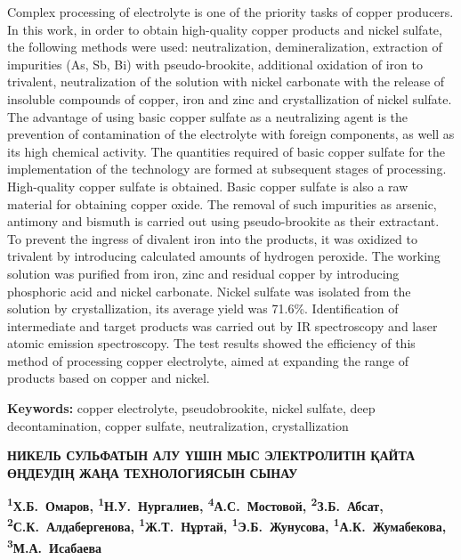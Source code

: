 Complex processing of electrolyte is one of the priority tasks of copper
producers. In this work, in order to obtain high-quality copper products
and nickel sulfate, the following methods were used: neutralization,
demineralization, extraction of impurities (As, Sb, Bi) with
pseudo-brookite, additional oxidation of iron to trivalent,
neutralization of the solution with nickel carbonate with the release of
insoluble compounds of copper, iron and zinc and crystallization of
nickel sulfate. The advantage of using basic copper sulfate as a
neutralizing agent is the prevention of contamination of the electrolyte
with foreign components, as well as its high chemical activity. The
quantities required of basic copper sulfate for the implementation of
the technology are formed at subsequent stages of processing.
High-quality copper sulfate is obtained. Basic copper sulfate is also a
raw material for obtaining copper oxide. The removal of such impurities
as arsenic, antimony and bismuth is carried out using pseudo-brookite as
their extractant. To prevent the ingress of divalent iron into the
products, it was oxidized to trivalent by introducing calculated amounts
of hydrogen peroxide. The working solution was purified from iron, zinc
and residual copper by introducing phosphoric acid and nickel carbonate.
Nickel sulfate was isolated from the solution by crystallization, its
average yield was 71.6\%. Identification of intermediate and target
products was carried out by IR spectroscopy and laser atomic emission
spectroscopy. The test results showed the efficiency of this method of
processing copper electrolyte, aimed at expanding the range of products
based on copper and nickel.

{\bfseries Keywords:} copper electrolyte, pseudobrookite, nickel sulfate,
deep decontamination, copper sulfate, neutralization, crystallization

\begin{articleheader}
{\bfseries НИКЕЛЬ СУЛЬФАТЫН АЛУ ҮШІН МЫС ЭЛЕКТРОЛИТІН ҚАЙТА ӨҢДЕУДІҢ ЖАҢА ТЕХНОЛОГИЯСЫН СЫНАУ}

{\bfseries
\textsuperscript{1}Х.Б.~Омаров\textsuperscript{\envelope },
\textsuperscript{1}Н.У.~Нургалиев\textsuperscript{\envelope },
\textsuperscript{4}А.С.~Мостовой,
\textsuperscript{2}З.Б.~Абсат,
\textsuperscript{2}С.К.~Алдабергенова,
\textsuperscript{1}Ж.Т.~Нұртай,
\textsuperscript{1}Э.Б.~Жунусова,
\textsuperscript{1}А.К.~Жумабекова,
\textsuperscript{3}М.А.~Исабаева}
\end{articleheader}

